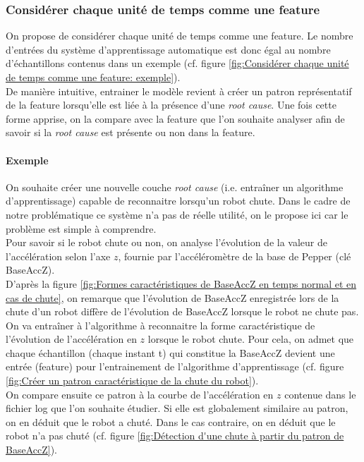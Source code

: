 \subsubsection{Considérer chaque unité de temps comme une feature}
\label{Automatisation du processus d'investigation: Reconnaissance de motifs: Différentes approches étudiées: Considérer chaque unité de temps comme une feature}
On propose de considérer chaque unité de temps comme une feature. Le nombre d'entrées du système d'apprentissage automatique est donc égal au nombre d'échantillons contenus dans un exemple (cf. figure \ref{fig:Considérer chaque unité de temps comme une feature: exemple}). \\
De manière intuitive, entrainer le modèle revient à créer un patron représentatif de la feature lorsqu'elle est liée à la présence d'une \emph{root cause}. Une fois cette forme apprise, on la compare avec la feature que l'on souhaite analyser afin de savoir si la \emph{root cause} est présente ou non dans la feature.
\newline

\paragraph{Exemple} On souhaite créer une nouvelle couche \emph{root cause} (i.e. entraîner un algorithme d'apprentissage) capable de reconnaitre lorsqu'un robot chute. Dans le cadre de notre problématique ce système n'a pas de réelle utilité, on le propose ici car le problème est simple à comprendre. \\
Pour savoir si le robot chute ou non, on analyse l'évolution de la valeur de l'accélération selon l'axe $z$, fournie par l'accéléromètre de la base de Pepper (clé BaseAccZ). \\
D'après la figure \ref{fig:Formes caractéristiques de BaseAccZ en temps normal et en cas de chute}, on remarque que l'évolution de BaseAccZ enregistrée lors de la chute d'un robot diffère de l'évolution de BaseAccZ lorsque le robot ne chute pas. On va entraîner à l'algorithme à reconnaitre la forme caractéristique de l'évolution de l'accélération en $z$ lorsque le robot chute. Pour cela, on admet que chaque échantillon (chaque instant t) qui constitue la BaseAccZ devient une entrée (feature) pour l'entrainement de l'algorithme d'apprentissage (cf. figure \ref{fig:Créer un patron caractéristique de la chute du robot}). \\
On compare ensuite ce patron à la courbe de l'accélération en $z$ contenue dans le fichier log que l'on souhaite étudier. Si elle est globalement similaire au patron, on en déduit que le robot a chuté. Dans le cas contraire, on en déduit que le robot n'a pas chuté (cf. figure \ref{fig:Détection d'une chute à partir du patron de BaseAccZ}).

